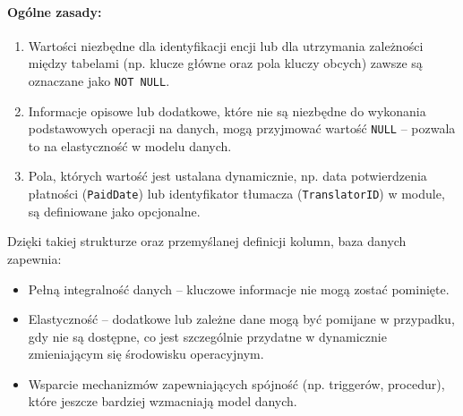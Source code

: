 \documentclass[12pt]{article}
\begin{document}
\paragraph{Ogólne zasady:}
\begin{enumerate}
    \item Wartości niezbędne dla identyfikacji encji lub dla utrzymania zależności między tabelami (np. klucze główne oraz pola kluczy obcych) zawsze są oznaczane jako \texttt{NOT NULL}.
    \item Informacje opisowe lub dodatkowe, które nie są niezbędne do wykonania podstawowych operacji na danych, mogą przyjmować wartość \texttt{NULL} – pozwala to na elastyczność w modelu danych.
    \item Pola, których wartość jest ustalana dynamicznie, np. data potwierdzenia płatności (\texttt{PaidDate}) lub identyfikator tłumacza (\texttt{TranslatorID}) w module, są definiowane jako opcjonalne.
\end{enumerate}

Dzięki takiej strukturze oraz przemyślanej definicji kolumn, baza danych zapewnia:
\begin{itemize}
    \item Pełną integralność danych – kluczowe informacje nie mogą zostać pominięte.
    \item Elastyczność – dodatkowe lub zależne dane mogą być pomijane w przypadku, gdy nie są dostępne, co jest szczególnie przydatne w dynamicznie zmieniającym się środowisku operacyjnym.
    \item Wsparcie mechanizmów zapewniających spójność (np. triggerów, procedur), które jeszcze bardziej wzmacniają model danych.
\end{itemize}
\end{document}
